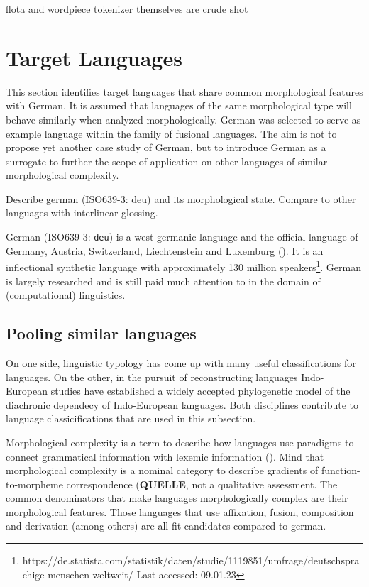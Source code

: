 flota and wordpiece tokenizer themselves are crude shot


\section{Target Languages}
\label{sec:target-languages}
This section identifies target languages that share common morphological features with German.
It is assumed that languages of the same morphological type will behave similarly when analyzed morphologically.
German was selected to serve as example language within the family of fusional languages.
The aim is not to propose yet another case study of German, but to introduce German as a surrogate to further the scope of application on other languages of similar morphological complexity.

Describe german (ISO639-3: deu) and its morphological state. Compare to other languages with interlinear glossing.


German (ISO639-3: \texttt{deu}) is a west-germanic language and the official language of Germany, Austria, Switzerland, Liechtenstein and Luxemburg (\cite{METZLER2016}).
It is an inflectional synthetic language with approximately 130 million speakers\footnote{https://de.statista.com/statistik/daten/studie/1119851/umfrage/deutschsprachige-menschen-weltweit/ Last accessed: 09.01.23}.
German is largely researched and is still paid much attention to in the domain of (computational) linguistics.


\subsection{Pooling similar languages}
\label{subsec:german-as-example}



On one side, linguistic typology has come up with many useful classifications for languages.
On the other, in the pursuit of reconstructing languages Indo-European studies have established a widely accepted phylogenetic model of the diachronic dependecy of Indo-European languages.
Both disciplines contribute to language classicifications that are used in this subsection.

Morphological complexity is a term to describe how languages use paradigms to connect grammatical information with lexemic information (\cite{MORPHOLOGICALCOMPLEXITY}).
Mind that morphological complexity is a nominal category to describe gradients of function-to-morpheme correspondence (\textbf{QUELLE}, not a qualitative assessment.
The common denominators that make languages morphologically complex are their morphological features.
Those languages that use affixation, fusion, composition and derivation (among others) are all fit candidates compared to german.

